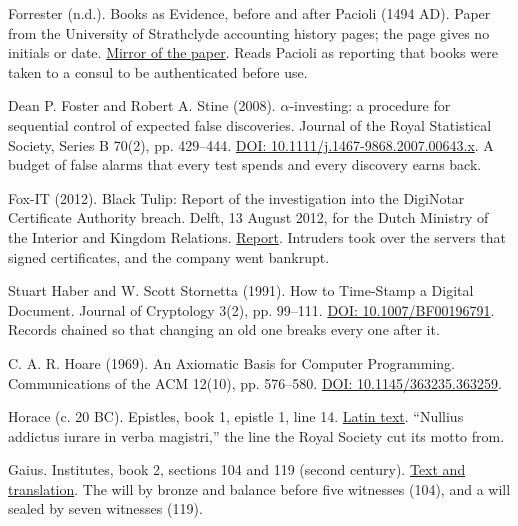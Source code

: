 \documentclass[11pt,twoside]{article}
\theoremstyle{thielethm}
\theoremstyle{thieledef}
\theoremstyle{thieledef}
\theoremstyle{thieledef}
\theoremstyle{thielethm}
\theoremstyle{thieleobs}
\theoremstyle{thielethm}
\begin{document}
\noindent Forrester (n.d.). Books as Evidence, before and after Pacioli (1494 AD). Paper from the University of Strathclyde accounting history pages; the page gives no initials or date. \href{http://www.cs.trinity.edu/rjensen/readings/history/forrester/a01before1494AD.htm}{Mirror of the paper}. Reads Pacioli as reporting that books were taken to a consul to be authenticated before use.
\par\medskip

\noindent Dean P. Foster and Robert A. Stine (2008). $\alpha$-investing: a procedure for sequential control of expected false discoveries. Journal of the Royal Statistical Society, Series B 70(2), pp. 429--444. \href{https://doi.org/10.1111/j.1467-9868.2007.00643.x}{DOI: 10.1111/j.1467-9868.2007.00643.x}. A budget of false alarms that every test spends and every discovery earns back.
\par\medskip

\noindent Fox-IT (2012). Black Tulip: Report of the investigation into the DigiNotar Certificate Authority breach. Delft, 13 August 2012, for the Dutch Ministry of the Interior and Kingdom Relations. \href{https://zoek.officielebekendmakingen.nl/blg-191225.pdf}{Report}. Intruders took over the servers that signed certificates, and the company went bankrupt.
\par\medskip

\noindent Stuart Haber and W. Scott Stornetta (1991). How to Time-Stamp a Digital Document. Journal of Cryptology 3(2), pp. 99--111. \href{https://doi.org/10.1007/BF00196791}{DOI: 10.1007/BF00196791}. Records chained so that changing an old one breaks every one after it.
\par\medskip

\noindent C. A. R. Hoare (1969). An Axiomatic Basis for Computer Programming. Communications of the ACM 12(10), pp. 576--580. \href{https://doi.org/10.1145/363235.363259}{DOI: 10.1145/363235.363259}.
\par\medskip

\noindent Horace (c. 20 BC). Epistles, book 1, epistle 1, line 14. \href{https://www.thelatinlibrary.com/horace/epist1.shtml}{Latin text}. ``Nullius addictus iurare in verba magistri,'' the line the Royal Society cut its motto from.
\par\medskip

\noindent Gaius. Institutes, book 2, sections 104 and 119 (second century). \href{https://droitromain.univ-grenoble-alpes.fr/Anglica/gai2_Poste.htm}{Text and translation}. The will by bronze and balance before five witnesses (104), and a will sealed by seven witnesses (119).
\par\medskip
\end{document}
